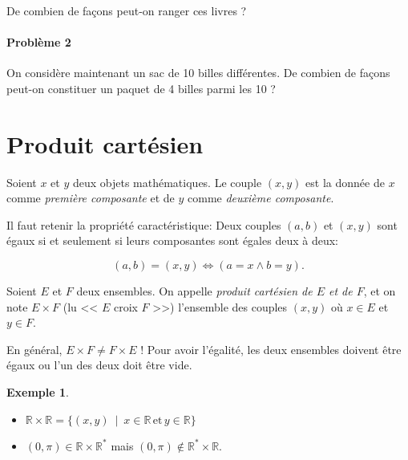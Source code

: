 \documentclass[twoside,11pt]{article}
\newcommand{\R}{\mathbb R}
\theoremstyle{definition}
\newtheorem{exe}{Exemple}
\theoremstyle{remark}
\theoremstyle{theorem}
\begin{document}
\begin{figure}[h]
\centering
{}
\end{figure}

De combien de façons peut-on ranger ces livres ?



\paragraph{Problème 2} On considère maintenant un sac de 10 billes différentes. De combien de façons peut-on constituer un paquet de 4 billes parmi les 10 ?

\section{Produit cartésien}

\begin{defn}
	Soient $x$ et $y$ deux objets mathématiques. Le couple $(x,y)$ est la donnée de $x$ comme \textit{première composante} et de $y$ comme \textit{deuxième composante}.
	
	Il faut retenir la propriété caractéristique:
	Deux couples $(a,b)$ et $(x,y)$ sont égaux si et seulement si leurs composantes sont égales deux à deux:
	
	\[
	(a,b) = (x,y) \Longleftrightarrow (a=x\land b=y).
	\]
\end{defn}

\begin{defn}
Soient $E$ et $F$ deux ensembles. On appelle \textit{produit cartésien de $E$ et de $F$}, et on note $E\times F$ (lu << $E$ croix $F$ >>) l'ensemble des couples $(x,y)$ où $x\in E$ et $y\in F$.
\end{defn}

\begin{rem}
En général, $E\times F\neq F\times E$ ! Pour avoir l'égalité, les deux ensembles doivent être égaux ou l'un des deux doit être vide.
\end{rem}

\begin{exe}\leavevmode
\begin{itemize}
\item $\R\times\R = \{(x,y)\ \mid\ x\in\R\,\text{et}\,y\in\R \}$
\item $(0,\pi)\in\R\times\R^*$ mais $(0,\pi)\not\in \R^*\times\R$.
\end{itemize}
\end{exe}
\end{document}
